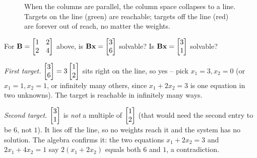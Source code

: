 \begin{figure}[H]
\centering
{}
\caption{When the columns are parallel, the column space collapses to a line. Targets on the line (green) are reachable; targets off the line (red) are forever out of reach, no matter the weights.}
\label{ch03:collapse-line}
\end{figure}

\begin{example}\label{ch03:ex-solvable}
For $\mathbf{B}=\begin{bmatrix}1&2\\2&4\end{bmatrix}$ above, is $\mathbf{B}\mathbf{x}=\begin{bmatrix}3\\6\end{bmatrix}$ solvable? Is $\mathbf{B}\mathbf{x}=\begin{bmatrix}3\\1\end{bmatrix}$ solvable?

\emph{First target.} $\begin{bmatrix}3\\6\end{bmatrix} = 3\begin{bmatrix}1\\2\end{bmatrix}$ sits right on the line, so yes -- pick $x_1=3, x_2=0$ (or $x_1=1,x_2=1$, or infinitely many others, since $x_1+2x_2=3$ is one equation in two unknowns). The target is reachable in infinitely many ways.

\emph{Second target.} $\begin{bmatrix}3\\1\end{bmatrix}$ is \emph{not} a multiple of $\begin{bmatrix}1\\2\end{bmatrix}$ (that would need the second entry to be $6$, not $1$). It lies off the line, so no weights reach it and the system has no solution. The algebra confirms it: the two equations $x_1+2x_2=3$ and $2x_1+4x_2=1$ say $2(x_1+2x_2)$ equals both $6$ and $1$, a contradiction.
\end{example}

